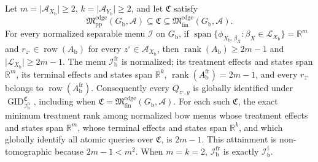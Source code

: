 Let \(m=\lvert\mathcal A_{X_{\mathrm b}}\rvert\geq2\), \(k=\lvert\mathcal A_{Y_{\mathrm b}}\rvert\geq2\), and let \(\mathfrak C\) satisfy
\[
\mathfrak M_{\mathrm{pp}}^{\mathrm{edge}}(G_{\mathrm b},\mathcal A)
\subseteq\mathfrak C
\subseteq\mathfrak M_{\mathrm{fin}}^{\mathrm{edge}}(G_{\mathrm b},\mathcal A).
\]
For every normalized separable menu \(\mathcal I\) on \(G_{\mathrm b}\), if \(\operatorname{span}\{\phi_{X_{\mathrm b},\beta_X}:\beta_X\in\mathcal L_{X_{\mathrm b}}\}=\mathbb R^m\) and \(r_{z^{\circ}}\in\operatorname{row}(A_{\mathrm b})\) for every \(z^{\circ}\in\mathcal A_{X_{\mathrm b}}\), then \(\operatorname{rank}(A_{\mathrm b})\geq2m-1\) and \(\lvert\mathcal L_{X_{\mathrm b}}\rvert\geq2m-1\).  The menu \(\mathcal I_{\mathrm b}^{\mathrm{fr}}\) is normalized; its treatment effects and states span \(\mathbb R^m\), its terminal effects and states span \(\mathbb R^k\), \(\operatorname{rank}(A_{\mathrm b}^{\mathrm{fr}})=2m-1\), and every \(r_{z^{\circ}}\) belongs to \(\operatorname{row}(A_{\mathrm b}^{\mathrm{fr}})\).  Consequently every \(Q_{z^{\circ},y}\) is globally identified under \(\operatorname{GID}_{\mathcal I_{\mathrm b}^{\mathrm{fr}}}^{\mathfrak C}\), including when \(\mathfrak C=\mathfrak M_{\mathrm{fin}}^{\mathrm{edge}}(G_{\mathrm b},\mathcal A)\).  For each such \(\mathfrak C\), the exact minimum treatment rank among normalized bow menus whose treatment effects and states span \(\mathbb R^m\), whose terminal effects and states span \(\mathbb R^k\), and which globally identify all atomic queries over \(\mathfrak C\), is \(2m-1\).  This attainment is non-tomographic because \(2m-1<m^2\).  When \(m=k=2\), \(\mathcal I_{\mathrm b}^{\mathrm{fr}}\) is exactly \(\mathcal I_{\mathrm b}^{\dagger}\).